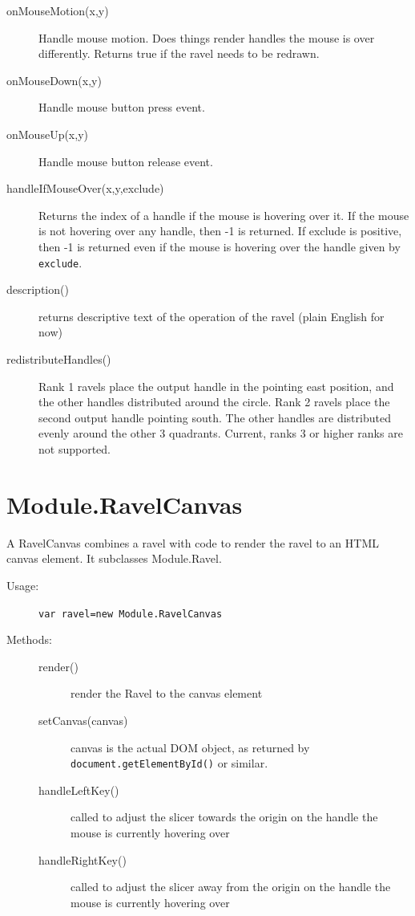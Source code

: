 \documentclass{article}
\begin{document}
\begin{description}
\begin{description}
\item[onMouseMotion(x,y)] Handle mouse motion. Does things render
handles the mouse is over differently. Returns true if the ravel needs
to be redrawn.
\item[onMouseDown(x,y)] Handle mouse button press event.
\item[onMouseUp(x,y)] Handle mouse button release event.

\item[handleIfMouseOver(x,y,exclude)] Returns the index of a handle if
the mouse is hovering over it. If the mouse is not hovering over any
handle, then -1 is returned. If exclude is positive, then -1 is
returned even if the mouse is hovering over the handle given by {\tt
exclude}.

\item[description()] returns descriptive text of the operation of the
ravel (plain English for now)

\item[redistributeHandles()] Rank 1 ravels place the output handle in
the pointing east position, and the other handles distributed around
the circle. Rank 2 ravels place the second output handle pointing
south. The other handles are distributed evenly around the other 3
quadrants. Current, ranks 3 or higher ranks are not supported.

\end{description} 
\end{description} 

\section{Module.RavelCanvas}

A RavelCanvas combines a ravel with code to render the ravel to an
HTML canvas element. It subclasses Module.Ravel.

\begin{description}
\item[Usage:] \verb+var ravel=new Module.RavelCanvas+

\item[Methods:]\mbox{}
\begin{description}
\item[render()] render the Ravel to the canvas element
\item[setCanvas(canvas)] canvas is the actual DOM object, as returned
by {\tt document.getElementById()} or similar.
\item[handleLeftKey()] called to adjust the slicer towards the origin
on the handle the mouse is currently hovering over
\item[handleRightKey()] called to adjust the slicer away from the origin
on the handle the mouse is currently hovering over
\end{description}
\end{description}
\end{document}
